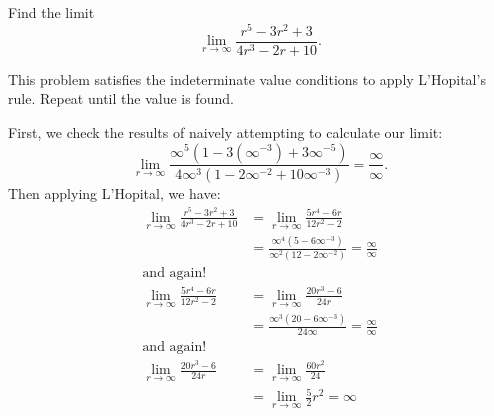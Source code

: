 \documentclass{ximera}
\author{Emma Smith Zbarsky}
\begin{document}
\begin{exercise}

Find the limit \[\lim_{r\to \infty} \frac{r^5-3r^2+3}{4r^3-2r+10}.\]


\begin{hint}
This problem satisfies the indeterminate value conditions to apply
L'Hopital's rule. Repeat until the value is found.
\end{hint}


\begin{hint}
First, we check the results of naively attempting to calculate our
limit:
\[\lim_{r\to\infty} \frac{\infty^5\left(1-3(\infty^{-3})+3\infty^{-5}\right)}{4\infty^3\left(1-2\infty^{-2}+10\infty^{-3}\right)} = \frac{\infty}{\infty}.\]
Then applying L'Hopital, we have: \begin{align*}
\lim_{r\to\infty} \frac{r^5-3r^2+3}{4r^3-2r+10} &= \lim_{r\to\infty} \frac{5r^4-6r}{12r^2-2} \\
&= \frac{\infty^4\left(5-6\infty^{-3}\right)}{\infty^2\left(12-2\infty^{-2}\right)} = \frac{\infty}{\infty} \\
\mbox{and again!} & \\
\lim_{r\to\infty} \frac{5r^4-6r}{12r^2-2} &= \lim_{r\to\infty} \frac{20r^3-6}{24r} \\
&= \frac{\infty^3\left(20-6\infty^{-3}\right)}{24\infty} = \frac{\infty}{\infty} \\
\mbox{and again!} & \\
\lim_{r\to\infty} \frac{20r^3-6}{24r} &= \lim_{r\to\infty} \frac{60r^2}{24} \\
&= \lim_{r\to\infty} \frac{5}{2}r^2 = \infty
\end{align*}
\end{hint}


\begin{multipleChoice}
\choice[correct]{$\infty$}
\choice{$-\infty$}
\end{multipleChoice}

\end{exercise}
\end{document}
